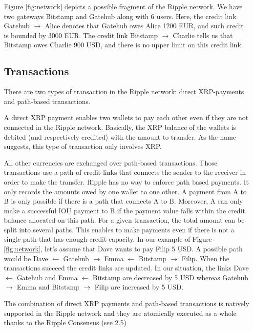 Figure \ref{fig:network} depicts a possible fragment of the Ripple network. We have two gateways Bitstamp and Gatehub along with 6 users. Here, the credit link Gatehub $\rightarrow$ Alice denotes that Gatehub owes Alice 1200 EUR, and such credit is bounded by 3000 EUR. The credit link Bitstamp $\rightarrow$ Charlie tells us that Bitstamp owes Charlie 900 USD, and there is no upper limit on this credit link.

\subsection{Transactions}
There are two types of transaction in the Ripple network: direct XRP-payments and path-based transactions.

A direct XRP payment enables two wallets to pay each other even if they are not connected in the Ripple network. Basically, the XRP balance of the wallets is debited (and respectively credited) with the amount to transfer. As the name suggests, this type of transaction only involves XRP. 

All other currencies are exchanged over path-based transactions. Those transactions use a path of credit links that connects the sender to the receiver in order to make the transfer. Ripple has no way to enforce path based payments. It only records the amounts owed by one wallet to one other. A payment from A to B is only possible if there is a path that connects A to B. Moreover, A can only make a successful IOU payment to B if the payment value falls within the credit balance allocated on this path. For a given transaction, the total amount can be split into several paths. This enables to make payments even if there is not a single path that has enough credit capacity. In our example of Figure \ref{fig:network}, let's assume that Dave wants to pay Filip 5 USD. A possible path would be Dave $\leftarrow$ Gatehub $\rightarrow$ Emma $\leftarrow$ Bitstamp $\rightarrow$ Filip. When the transactions succeed the credit links are updated. In our situation, the links Dave $\leftarrow$ Gatehub and Emma $\leftarrow$ Bitstamp are decreased by 5 USD whereas Gatehub $\rightarrow$ Emma and Bitstamp $\rightarrow$ Filip are increased by 5 USD.

The combination of direct XRP payments and path-based transactions is natively supported in the Ripple network and they are atomically executed as a whole thanks to the Ripple Consensus (see 2.5)

